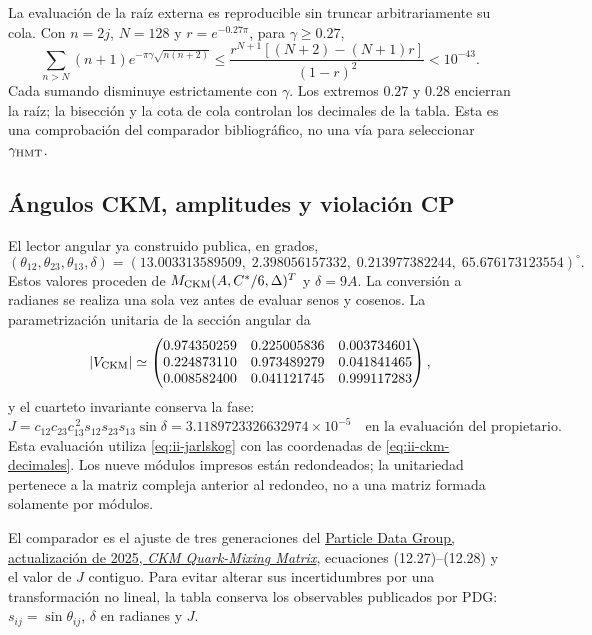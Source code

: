 La evaluación de la raíz externa es reproducible sin truncar
arbitrariamente su cola. Con \(n=2j\), \(N=128\) y
\(r=e^{-0.27\pi}\), para \(\gamma\geq0.27\),
\[
 \sum_{n>N}(n+1)e^{-\pi\gamma\sqrt{n(n+2)}}
 \leq \frac{r^{N+1}[(N+2)-(N+1)r]}{(1-r)^2}<10^{-43}.
\]
Cada sumando disminuye estrictamente con \(\gamma\). Los extremos
\(0.27\) y \(0.28\) encierran la raíz; la bisección y la cota de cola
controlan los decimales de la tabla. Esta es una comprobación del
comparador bibliográfico, no una vía para seleccionar \(\gamma_{\rm HMT}\).

\subsection{Ángulos CKM, amplitudes y violación CP}

El lector angular ya construido publica, en grados,
\begin{equation}
 (\theta_{12},\theta_{23},\theta_{13},\delta)
 =(13.003313589509,\;2.398056157332,\;
 0.213977382244,\;65.676173123554)^\circ.
 \label{eq:ii-ckm-decimales}
\end{equation}
Estos valores proceden de \(M_{\rm CKM}(A,C^*/6,\Delta)^T\) y
\(\delta=9A\). La conversión a radianes se realiza una sola vez antes
de evaluar senos y cosenos. La parametrización unitaria de la sección
angular da
\[
 |V_{\rm CKM}|\simeq
 \begin{pmatrix}
 0.974350259&0.225005836&0.003734601\\
 0.224873110&0.973489279&0.041841465\\
 0.008582400&0.041121745&0.999117283
 \end{pmatrix},
\]
y el cuarteto invariante conserva la fase:
\[
 J=c_{12}c_{23}c_{13}^{\,2}s_{12}s_{23}s_{13}\sin\delta
 =3.1189723326632974\times10^{-5}\quad
 \text{en la evaluación del propietario.}
\]
Esta evaluación utiliza \eqref{eq:ii-jarlskog} con las coordenadas de
\eqref{eq:ii-ckm-decimales}. Los nueve módulos impresos están redondeados; la unitariedad pertenece
a la matriz compleja anterior al redondeo, no a una matriz formada
solamente por módulos.

El comparador es el ajuste de tres generaciones del
\href{https://pdg.lbl.gov/2025/reviews/rpp2025-rev-ckm-matrix.pdf}
{Particle Data Group, actualización de 2025, \emph{CKM Quark-Mixing Matrix}},
ecuaciones (12.27)--(12.28) y el valor de \(J\) contiguo. Para evitar
alterar sus incertidumbres por una transformación no lineal, la tabla
conserva los observables publicados por PDG: \(s_{ij}=\sin\theta_{ij}\),
\(\delta\) en radianes y \(J\).

